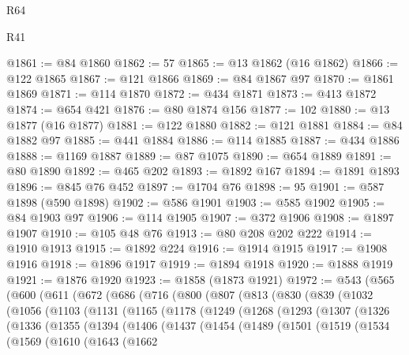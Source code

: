 \begin{lexlean}{R64}
\begin{lexlean}{R41}
\begin{coremodule}
{{{{{{{{{{{{{{{{{{{{{{{{{{{{{{{{{{{{{{{{{{{{{{{{{{{{{{{{{{{{{{{{{{{{{{{{{{{{{{{{{{{{{{{{{@1861 := @84 @1860
@1862 := 57
@1865 := @13 @1862 (@16 @1862)
@1866 := @122 @1865
@1867 := @121 @1866
@1869 := @84 @1867 @97
@1870 := @1861 @1869
@1871 := @114 @1870
@1872 := @434 @1871
@1873 := @413 @1872
@1874 := @654 @421
@1876 := @80 @1874 @156
@1877 := 102
@1880 := @13 @1877 (@16 @1877)
@1881 := @122 @1880
@1882 := @121 @1881
@1884 := @84 @1882 @97
@1885 := @441 @1884
@1886 := @114 @1885
@1887 := @434 @1886
@1888 := @1169 @1887
@1889 := @87 @1075
@1890 := @654 @1889
@1891 := @80 @1890
@1892 := @465 @202
@1893 := @1892 @167
@1894 := @1891 @1893
@1896 := @845 @76 @452
@1897 := @1704 @76
@1898 := 95
@1901 := @587 @1898 (@590 @1898)
@1902 := @586 @1901
@1903 := @585 @1902
@1905 := @84 @1903 @97
@1906 := @114 @1905
@1907 := @372 @1906
@1908 := @1897 @1907
@1910 := @105 @48 @76
@1913 := @80 @208 @202 @222
@1914 := @1910 @1913
@1915 := @1892 @224
@1916 := @1914 @1915
@1917 := @1908 @1916
@1918 := @1896 @1917
@1919 := @1894 @1918
@1920 := @1888 @1919
@1921 := @1876 @1920
@1923 := @1858 (@1873 @1921)
@1972 := @543
    (@565
      (@600
        (@611
          (@672
            (@686
              (@716
                (@800
                  (@807
                    (@813
                      (@830
                        (@839
                          (@1032
                            (@1056
                              (@1103
                                (@1131
                                  (@1165
                                    (@1178
                                      (@1249
                                        (@1268
                                          (@1293
                                            (@1307
                                              (@1326
                                                (@1336
                                                  (@1355
                                                    (@1394
                                                      (@1406
                                                        (@1437
                                                          (@1454
                                                            (@1489
                                                              (@1501
                                                                (@1519
                                                                  (@1534
                                                                    (@1569
                                                                      (@1610
                                                                        (@1643
                                                                          (@1662
}}}}}}}}}}}}}}}}}}}}}}}}}}}}}}}}}}}}}}}}}}}}}}}}}}}}}}}}}}}}}}}}}}}}}}}}}}}}}}}}}}}}}}}}}
\end{coremodule}
\end{lexlean}
\end{lexlean}
